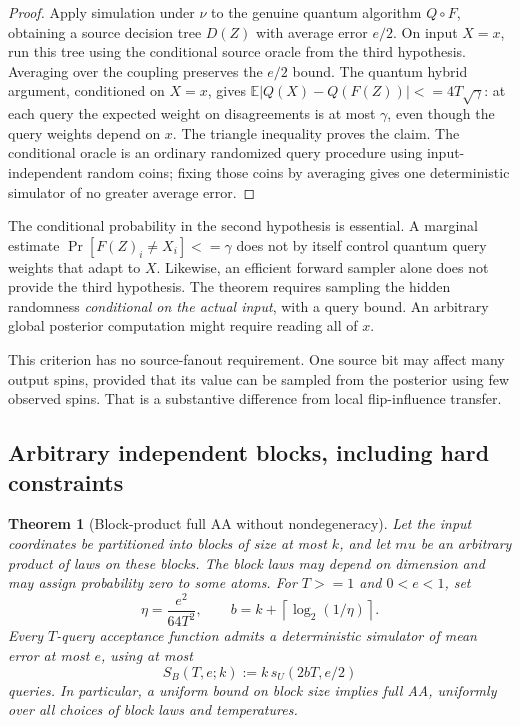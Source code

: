 \documentclass[11pt]{article}
\newtheorem{theorem}{Theorem}[section]
\theoremstyle{definition}
\theoremstyle{remark}
\def\mu{mu}\def\rho{rho}\def\le{<=}\def\ge{>=}%
\begin{document}
\begin{proof}
Apply simulation under \(\nu\) to the genuine quantum algorithm
\(Q\circ F\), obtaining a source decision tree \(D(Z)\) with average
error \(e/2\). On input \(X=x\), run this tree using the conditional
source oracle from the third hypothesis. Averaging over the coupling
preserves the \(e/2\) bound. The quantum hybrid argument, conditioned
on \(X=x\), gives
\(\mathbb E|Q(X)-Q(F(Z))|\le4T\sqrt\gamma\): at each query the
expected weight on disagreements is at most \(\gamma\), even though
the query weights depend on \(x\). The triangle inequality proves the
claim. The conditional oracle is an ordinary randomized query procedure
using input-independent random coins; fixing those coins by averaging
gives one deterministic simulator of no greater average error.
\end{proof}

The conditional probability in the second hypothesis is essential.
A marginal estimate \(\Pr[F(Z)_i\ne X_i]\le\gamma\) does not by
itself control quantum query weights that adapt to \(X\). Likewise,
an efficient forward sampler alone does not provide the third
hypothesis. The theorem requires sampling the hidden randomness
\emph{conditional on the actual input}, with a query bound. An
arbitrary global posterior computation might require reading all of
\(x\).

This criterion has no source-fanout requirement. One source bit may
affect many output spins, provided that its value can be sampled from
the posterior using few observed spins. That is a substantive
difference from local flip-influence transfer.

\subsection{Arbitrary independent blocks, including hard constraints}
\label{sec:threshold-positive-blocks}

\begin{theorem}[Block-product full AA without nondegeneracy]
\label{thm:threshold-block-products}
Let the input coordinates be partitioned into blocks of size at most
\(k\), and let \(\mu\) be an arbitrary product of laws on these
blocks. The block laws may depend on dimension and may assign
probability zero to some atoms. For \(T\ge1\) and \(0<e<1\), set
\[
 \eta=\frac{e^2}{64T^2},\qquad
 b=k+\left\lceil\log_2(1/\eta)\right\rceil.
\]
Every \(T\)-query acceptance function admits a deterministic simulator
of mean error at most \(e\), using at most
\[
 S_B(T,e;k):=k\,s_U(2bT,e/2)
\]
queries. In particular, a uniform bound on block size implies full AA,
uniformly over all choices of block laws and temperatures.
\end{theorem}
\end{document}
